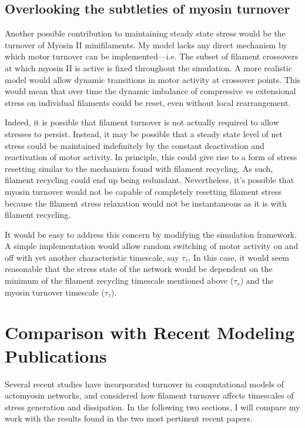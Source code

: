 \subsection{Overlooking the subtleties of myosin turnover}
Another possible contribution to maintaining steady state stress would be the turnover of Myosin II minifilaments.  My model lacks any direct mechanism by which motor turnover can be implemented---i.e. The subset of filament crossovers at which myosin II is active is fixed throughout the simulation. A more realistic model would allow dynamic transitions in motor activity at crossover points.  This would mean that over time the dynamic imbalance of compressive vs extensional stress on individual filaments could be reset, even without local rearrangement.

Indeed, it is possible that filament turnover is not actually required to allow stresses to persist.  Instead, it may be possible that a steady state level of net stress could be maintained indefinitely by the constant deactivation and reactivation of motor activity.  In principle, this could give rise to a form of stress resetting similar to the mechanism found with filament recycling.  As such, filament recycling could end up being redundant.  Nevertheless, it's possible that myosin turnover would not be capable of completely resetting filament stress because the filament stress relaxation would not be instantaneous as it is with filament recycling.

It would be easy to address this concern by modifying the simulation framework.  A simple implementation would allow random switching of motor activity on and off with yet another characteristic timescale, say $\tau_\tau$.  In this case, it would seem reasonable that the stress state of the network would be dependent on the minimum of the filament recycling timescale mentioned above ($\tau_r$) and the myosin turnover timescale ($\tau_\tau$).

\section{Comparison with Recent Modeling Publications}
\label{sec:compar_lit}
Several recent studies have incorporated turnover in computational models of actomyosin networks, and considered how filament turnover affects  timescales of stress generation and dissipation.  In the following two sections, I will compare my work with the results found in the two most pertinent recent papers.

